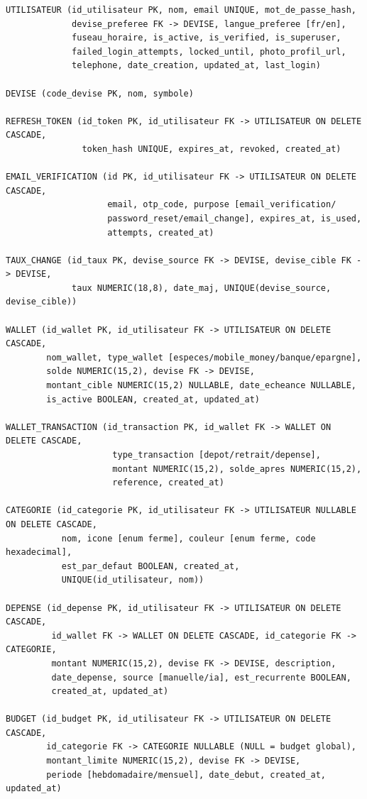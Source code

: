 \documentclass[11pt,a4paper]{article}
\begin{document}
\begin{lstlisting}
UTILISATEUR (id_utilisateur PK, nom, email UNIQUE, mot_de_passe_hash,
             devise_preferee FK -> DEVISE, langue_preferee [fr/en],
             fuseau_horaire, is_active, is_verified, is_superuser,
             failed_login_attempts, locked_until, photo_profil_url,
             telephone, date_creation, updated_at, last_login)

DEVISE (code_devise PK, nom, symbole)

REFRESH_TOKEN (id_token PK, id_utilisateur FK -> UTILISATEUR ON DELETE CASCADE,
               token_hash UNIQUE, expires_at, revoked, created_at)

EMAIL_VERIFICATION (id PK, id_utilisateur FK -> UTILISATEUR ON DELETE CASCADE,
                    email, otp_code, purpose [email_verification/
                    password_reset/email_change], expires_at, is_used,
                    attempts, created_at)

TAUX_CHANGE (id_taux PK, devise_source FK -> DEVISE, devise_cible FK -> DEVISE,
             taux NUMERIC(18,8), date_maj, UNIQUE(devise_source, devise_cible))

WALLET (id_wallet PK, id_utilisateur FK -> UTILISATEUR ON DELETE CASCADE,
        nom_wallet, type_wallet [especes/mobile_money/banque/epargne],
        solde NUMERIC(15,2), devise FK -> DEVISE,
        montant_cible NUMERIC(15,2) NULLABLE, date_echeance NULLABLE,
        is_active BOOLEAN, created_at, updated_at)

WALLET_TRANSACTION (id_transaction PK, id_wallet FK -> WALLET ON DELETE CASCADE,
                     type_transaction [depot/retrait/depense],
                     montant NUMERIC(15,2), solde_apres NUMERIC(15,2),
                     reference, created_at)

CATEGORIE (id_categorie PK, id_utilisateur FK -> UTILISATEUR NULLABLE ON DELETE CASCADE,
           nom, icone [enum ferme], couleur [enum ferme, code hexadecimal],
           est_par_defaut BOOLEAN, created_at,
           UNIQUE(id_utilisateur, nom))

DEPENSE (id_depense PK, id_utilisateur FK -> UTILISATEUR ON DELETE CASCADE,
         id_wallet FK -> WALLET ON DELETE CASCADE, id_categorie FK -> CATEGORIE,
         montant NUMERIC(15,2), devise FK -> DEVISE, description,
         date_depense, source [manuelle/ia], est_recurrente BOOLEAN,
         created_at, updated_at)

BUDGET (id_budget PK, id_utilisateur FK -> UTILISATEUR ON DELETE CASCADE,
        id_categorie FK -> CATEGORIE NULLABLE (NULL = budget global),
        montant_limite NUMERIC(15,2), devise FK -> DEVISE,
        periode [hebdomadaire/mensuel], date_debut, created_at, updated_at)


\end{lstlisting}
\end{document}
